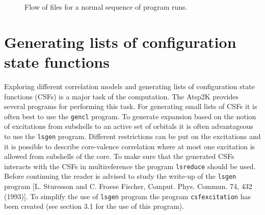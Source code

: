 \documentclass[fleqn,10pt]{book}
\begin{document}
\begin{figure}
{\small 
{}}
\caption{
 \label{fig:dataflow_blk}
 Flow of files for a normal sequence of program runs.}
\end{figure}

\clearpage

\section{Generating lists of configuration state functions}
Exploring different correlation models and generating lists of configuration state functions (CSFs) is a major task of the computation. The {\sc Atsp}2K provides 
several programs for performing this task. For generating small lists of CSFs it is often best to use the \verb+gencl+ program. To generate expansion based on the notion of excitations from subshells to an active set of orbitals it is often advantageous to use the \verb+lsgen+ program. Different restrictions can be put on the excitations and it is possible to describe core-valence correlation where at most one excitation is allowed from subshells of the core. To make sure that the generated CSFs interacts with the CSFs in multireference the program \verb+lsreduce+ should be used.
Before continuing the reader is advised to study the write-up of the \verb+lsgen+ program [L. Sturesson and C. Froese Fischer, Comput. Phys. 
Commun. 74, 432 (1993)]. To simplify the use of \verb+lsgen+ program the program \verb+csfexcitation+ has been created (see section 3.1 for the use of this program).
\end{document}
